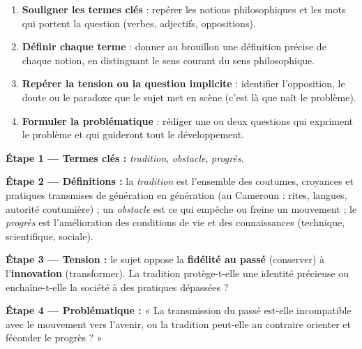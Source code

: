 \documentclass[11pt]{article}
\begin{document}
\begin{methode}
\begin{enumerate}
\item \textbf{Souligner les termes clés} : repérer les notions philosophiques et les mots qui portent la question (verbes, adjectifs, oppositions).
\item \textbf{Définir chaque terme} : donner au brouillon une définition précise de chaque notion, en distinguant le sens courant du sens philosophique.
\item \textbf{Repérer la tension ou la question implicite} : identifier l'opposition, le doute ou le paradoxe que le sujet met en scène (c'est là que naît le problème).
\item \textbf{Formuler la problématique} : rédiger une ou deux questions qui expriment le problème et qui guideront tout le développement.
\end{enumerate}
\end{methode}

\begin{exemplebox}
\textbf{Étape 1 — Termes clés :} \emph{tradition}, \emph{obstacle}, \emph{progrès}.

\textbf{Étape 2 — Définitions :} la \emph{tradition} est l'ensemble des coutumes, croyances et pratiques transmises de génération en génération (au Cameroun : rites, langues, autorité coutumière) ; un \emph{obstacle} est ce qui empêche ou freine un mouvement ; le \emph{progrès} est l'amélioration des conditions de vie et des connaissances (technique, scientifique, sociale).

\textbf{Étape 3 — Tension :} le sujet oppose la \textbf{fidélité au passé} (conserver) à l'\textbf{innovation} (transformer). La tradition protège-t-elle une identité précieuse ou enchaîne-t-elle la société à des pratiques dépassées ?

\textbf{Étape 4 — Problématique :} « La transmission du passé est-elle incompatible avec le mouvement vers l'avenir, ou la tradition peut-elle au contraire orienter et féconder le progrès ? »
\end{exemplebox}
\end{document}
